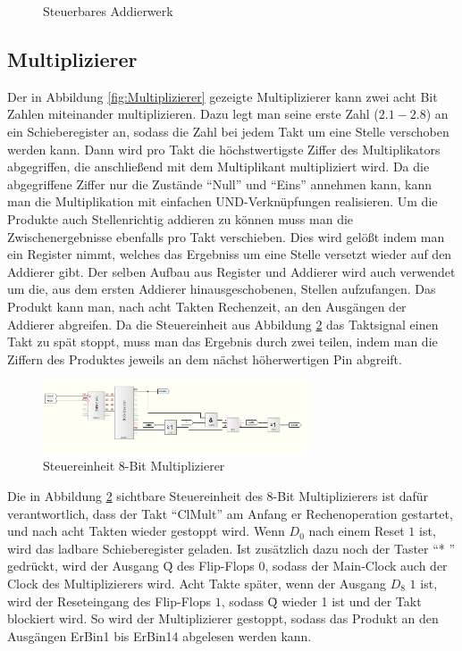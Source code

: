 \documentclass[a4paper,12pt,fleqn,oneside]{article}
\begin{document}
		\begin{figure}[h]
			\center
			
			\caption{Steuerbares Addierwerk}
			\label{fig:Addierwerk}
		\end{figure}
	\FloatBarrier



\newpage

	\subsection{Multiplizierer}
		Der in Abbildung \ref{fig:Multiplizierer} gezeigte Multiplizierer kann zwei acht Bit Zahlen miteinander multiplizieren. Dazu 
		legt man seine erste Zahl ($2.1 - 2.8$) an ein Schieberegister an, sodass die Zahl bei jedem Takt um eine Stelle verschoben 
		werden kann. Dann wird pro Takt die höchstwertigste Ziffer des Multiplikators abgegriffen, die anschließend mit dem 
		Multiplikant multipliziert wird. Da die abgegriffene Ziffer nur die Zustände  "`Null"' und  "`Eins"' annehmen kann, kann man 
		die Multiplikation mit einfachen UND-Verknüpfungen realisieren. Um die Produkte auch Stellenrichtig addieren zu können 
		muss man die Zwischenergebnisse ebenfalls pro Takt verschieben. Dies wird gelößt indem man ein Register nimmt, 
		welches das Ergebniss um eine Stelle versetzt wieder auf den Addierer gibt. Der selben Aufbau aus Register und Addierer 
		wird auch verwendet um die, aus dem ersten Addierer hinausgeschobenen, Stellen aufzufangen. Das Produkt kann man, 
		nach acht Takten Rechenzeit, an den Ausgängen der Addierer abgreifen. Da die Steuereinheit aus Abbildung 
		\ref{fig:Steuereinheit_Multiplizierer} das Taktsignal einen Takt zu spät stoppt, muss man das Ergebnis durch zwei teilen, 
		indem man die Ziffern des Produktes jeweils an dem nächst höherwertigen Pin abgreift.\\
		 
		
		\begin{figure}[h]
			\center
			\includegraphics[width=0.7\textwidth]{steuereinheit_multiplizierer}
			\caption{Steuereinheit 8-Bit Multiplizierer}
			\label{fig:Steuereinheit_Multiplizierer}
		\end{figure}

		\noindent
		Die in Abbildung \ref{fig:Steuereinheit_Multiplizierer} sichtbare Steuereinheit des 8-Bit Multiplizierers ist dafür 
		verantwortlich, dass der Takt "`ClMult"' am Anfang er Rechenoperation gestartet, und nach acht Takten wieder gestoppt 
		wird. Wenn $D_{0}$ nach einem Reset $1$ ist, wird das ladbare Schieberegister geladen. Ist zusätzlich dazu 
		noch der Taster "`* "' gedrückt, wird der Ausgang \={Q} des  Flip-Flops  $0$, sodass der Main-Clock auch der Clock des 
		Multiplizierers wird. Acht Takte später, wenn der Ausgang $D_{8}$ $1$ ist, wird der Reseteingang des Flip-Flops 
		$1$, sodass \={Q}  wieder 1 ist und der Takt blockiert wird. So wird der Multiplizierer gestoppt, sodass das Produkt an den
		Ausgängen ErBin1 bis ErBin14 abgelesen werden kann. 
\end{document}
